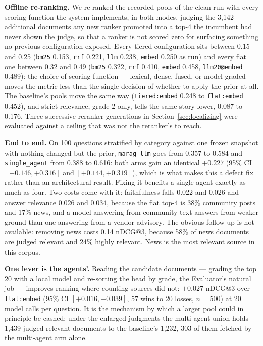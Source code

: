 \documentclass[10pt,conference]{IEEEtran}
\begin{document}
\textbf{Offline re-ranking.} We re-ranked the recorded pools of the clean run with every
scoring function the system implements, in both modes, judging the 3{,}142
additional documents any new ranker promoted into a top-4 the incumbent had never
shown the judge, so that a ranker is not scored zero for surfacing something no
previous configuration exposed. Every tiered configuration sits between 0.15 and
0.25 (\texttt{bm25} 0.153, \texttt{rrf} 0.221, \texttt{llm} 0.238,
\texttt{embed} 0.250 as run) and every flat one between 0.32 and 0.49
(\texttt{bm25} 0.322, \texttt{rrf} 0.410, \texttt{embed} 0.458,
\texttt{llm20@embed} 0.489): the choice of scoring function --- lexical, dense,
fused, or model-graded --- moves the metric less than the single decision of
whether to apply the prior at all. The baseline's pools move the same way
(\texttt{tiered:embed} 0.248 to \texttt{flat:embed} 0.452), and strict relevance,
grade 2 only, tells the same story lower, 0.087 to 0.176. Three successive
reranker generations in Section~\ref{sec:localizing} were evaluated against a
ceiling that was not the reranker's to reach.

\textbf{End to end.} On 100 questions stratified by category against one frozen
snapshot with nothing changed but the prior, \texttt{marag\_llm} goes from 0.357
to 0.584 and \texttt{single\_agent} from 0.388 to 0.616: both arms gain an
identical $+0.227$ (95\% CI $[+0.146,+0.316]$ and $[+0.144,+0.319]$), which is
what makes this a defect fix rather than an architectural result. Fixing it
benefits a single agent exactly as much as four. Two costs come with it:
faithfulness falls 0.022 and 0.026 and answer relevance 0.026 and 0.034, because
the flat top-4 is 38\% community posts and 17\% news, and a model answering from
community text answers from weaker ground than one answering from a vendor
advisory. The obvious follow-up is not available: removing news costs 0.14 nDCG@3,
because 58\% of news documents are judged relevant and 24\% highly relevant. News
is the most relevant source in this corpus.

\textbf{One lever is the agents'.} Reading the candidate documents --- grading the
top 20 with a local model and re-sorting the head by grade, the Evaluator's natural
job --- improves ranking where counting sources did not: $+0.027$ nDCG@3 over
\texttt{flat:embed} (95\% CI $[+0.016,+0.039]$, 57 wins to 20 losses, $n=500$) at
20 model calls per question. It is the mechanism by which a larger pool could in
principle be cashed: under the enlarged judgments the multi-agent union holds
1{,}439 judged-relevant documents to the baseline's 1{,}232, 303 of them fetched by
the multi-agent arm alone.
\end{document}
